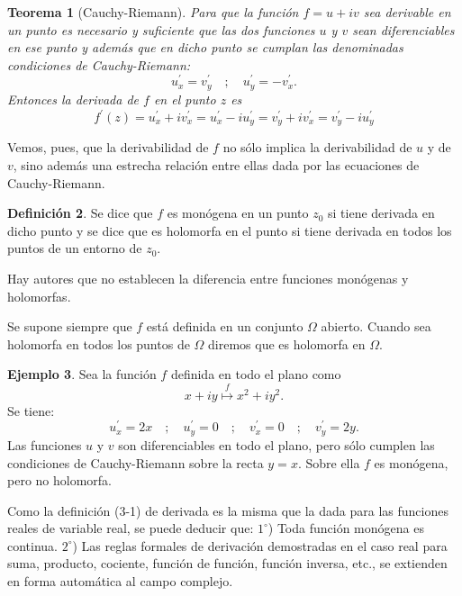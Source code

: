 \documentclass[10pt]{article}
\theoremstyle{plain}
\newtheorem{theorem}{Teorema}[section]
\theoremstyle{definition}
\newtheorem{definition}[theorem]{Definición}
\newtheorem{example}[theorem]{Ejemplo}
\theoremstyle{remark}
\begin{document}
\begin{theorem}[Cauchy-Riemann]
Para que la función $f=u+iv$ sea derivable en un punto es necesario y suficiente que las dos funciones $u$ y $v$ sean diferenciables en ese punto y además que en dicho punto se cumplan las denominadas condiciones de Cauchy-Riemann:
$$u_{x}^{\prime}=v_{y}^{\prime} \quad ; \quad u_{y}^{\prime}=-v_{x}^{\prime} .$$
Entonces la derivada de $f$ en el punto $z$ es
\begin{equation*}
f^{\prime}(z)=u_{x}^{\prime}+i v_{x}^{\prime}=u_{x}^{\prime}-i u_{y}^{\prime}=v_{y}^{\prime}+i v_{x}^{\prime}=v_{y}^{\prime}-i u_{y}^{\prime} \tag{3-5}
\end{equation*}
\end{theorem}

Vemos, pues, que la derivabilidad de $f$ no sólo implica la derivabilidad de $u$ y de $v$, sino además una estrecha relación entre ellas dada por las ecuaciones de Cauchy-Riemann.

\begin{definition}
Se dice que $f$ es monógena en un punto $z_{0}$ si tiene derivada en dicho punto y se dice que es holomorfa en el punto si tiene derivada en todos los puntos de un entorno de $z_{0}$.
\end{definition}

Hay autores que no establecen la diferencia entre funciones monógenas y holomorfas.

Se supone siempre que $f$ está definida en un conjunto $\Omega$ abierto. Cuando sea holomorfa en todos los puntos de $\Omega$ diremos que es holomorfa en $\Omega$.

\begin{example}
Sea la función $f$ definida en todo el plano como
$$x+i y \stackrel{f}{\longmapsto} x^{2}+i y^{2} .$$
Se tiene:
$$u_{x}^{\prime}=2 x \quad ; \quad u_{y}^{\prime}=0 \quad ; \quad v_{x}^{\prime}=0 \quad ; \quad v_{y}^{\prime}=2 y .$$
Las funciones $u$ y $v$ son diferenciables en todo el plano, pero sólo cumplen las condiciones de Cauchy-Riemann sobre la recta $y=x$. Sobre ella $f$ es monógena, pero no holomorfa.
\end{example}

Como la definición (3-1) de derivada es la misma que la dada para las funciones reales de variable real, se puede deducir que:
$1^{\circ}$) Toda función monógena es continua.
$2^{\circ}$) Las reglas formales de derivación demostradas en el caso real para suma, producto, cociente, función de función, función inversa, etc., se extienden en forma automática al campo complejo.
\end{document}
